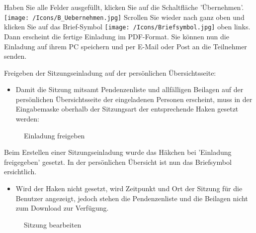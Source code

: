 Haben Sie alle Felder ausgefüllt, klicken Sie auf die Schaltfläche 'Übernehmen'. \texttt{[image: /Icons/B\_Uebernehmen.jpg]} \newline
Scrollen Sie wieder nach ganz oben und klicken Sie auf das Brief-Symbol \texttt{[image: /Icons/Briefsymbol.jpg]} oben links. Dann erscheint die fertige Einladung im PDF-Format. Sie können nun die Einladung auf ihrem PC speichern und per E-Mail oder Post an die Teilnehmer senden.

\vspace{\baselineskip}

Freigeben der Sitzungseinladung auf der persönlichen Übersichtsseite:

\begin{itemize}
\item
Damit die Sitzung mitsamt Pendenzenliste und allfälligen Beilagen auf der persönlichen Übersichtsseite der eingeladenen Personen erscheint, muss in der Eingabemaske oberhalb der Sitzungsart der entsprechende Haken gesetzt werden:
\end{itemize}

\begin{figure}[H]
\caption{Einladung freigeben}
\end{figure}

\begin{small}
Beim Erstellen einer Sitzungseinladung wurde das Häkchen bei 'Einladung freigegeben' gesetzt. In der persönlichen Übersicht ist nun das Briefsymbol ersichtlich.
\end{small}

\begin{itemize}
\item
Wird der Haken nicht gesetzt, wird Zeitpunkt und Ort der Sitzung für die Benutzer angezeigt, jedoch stehen die Pendenzenliste und die Beilagen nicht zum Download zur Verfügung.
\end{itemize}

\begin{figure}[H]
\caption{Sitzung bearbeiten}
\end{figure}

